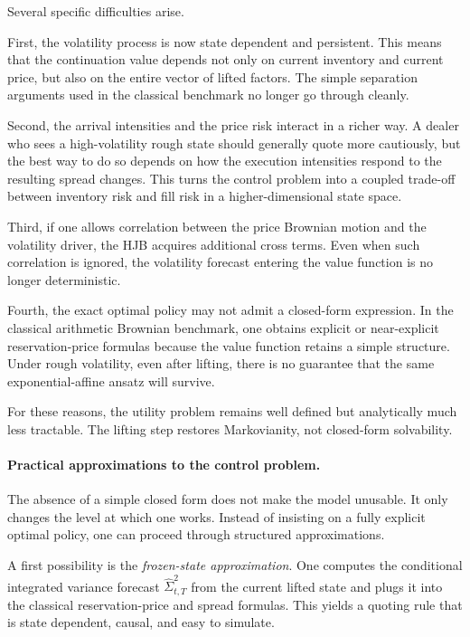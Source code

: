 Several specific difficulties arise.

First, the volatility process is now state dependent and persistent. This means that the continuation value depends not only on current inventory and current price, but also on the entire vector of lifted factors. The simple separation arguments used in the classical benchmark no longer go through cleanly.

Second, the arrival intensities and the price risk interact in a richer way. A dealer who sees a high-volatility rough state should generally quote more cautiously, but the best way to do so depends on how the execution intensities respond to the resulting spread changes. This turns the control problem into a coupled trade-off between inventory risk and fill risk in a higher-dimensional state space.

Third, if one allows correlation between the price Brownian motion and the volatility driver, the HJB acquires additional cross terms. Even when such correlation is ignored, the volatility forecast entering the value function is no longer deterministic.

Fourth, the exact optimal policy may not admit a closed-form expression. In the classical arithmetic Brownian benchmark, one obtains explicit or near-explicit reservation-price formulas because the value function retains a simple structure. Under rough volatility, even after lifting, there is no guarantee that the same exponential-affine ansatz will survive.

For these reasons, the utility problem remains well defined but analytically much less tractable. The lifting step restores Markovianity, not closed-form solvability.

\paragraph{Practical approximations to the control problem.}

The absence of a simple closed form does not make the model unusable. It only changes the level at which one works. Instead of insisting on a fully explicit optimal policy, one can proceed through structured approximations.

A first possibility is the \emph{frozen-state approximation}. One computes the conditional integrated variance forecast \(\widehat{\Sigma}_{t,T}^2\) from the current lifted state and plugs it into the classical reservation-price and spread formulas. This yields a quoting rule that is state dependent, causal, and easy to simulate.

